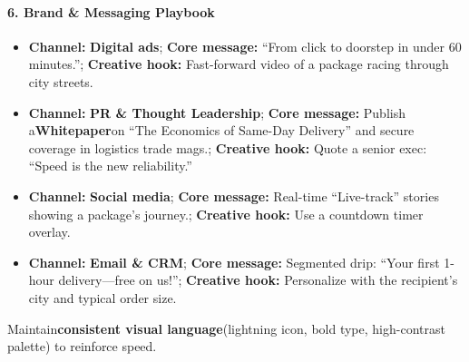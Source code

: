 \begin{persistbenchsample}[title={GPT-OSS-120B -- Cos Similarity Partitioned -> Partitioned -- Sample 3 (+3 Improvement)}]
\paragraph{6. Brand \& Messaging Playbook}
\begin{itemize}
  \item \textbf{Channel:} \textbf{Digital ads}; \textbf{Core message:} ``From click to doorstep in under 60 minutes.''; \textbf{Creative hook:} Fast-forward video of a package racing through city streets.
  \item \textbf{Channel:} \textbf{PR \& Thought Leadership}; \textbf{Core message:} Publish a\textbf{Whitepaper}on ``The Economics of Same-Day Delivery'' and secure coverage in logistics trade mags.; \textbf{Creative hook:} Quote a senior exec: ``Speed is the new reliability.''
  \item \textbf{Channel:} \textbf{Social media}; \textbf{Core message:} Real-time ``Live-track'' stories showing a package's journey.; \textbf{Creative hook:} Use a countdown timer overlay.
  \item \textbf{Channel:} \textbf{Email \& CRM}; \textbf{Core message:} Segmented drip: ``Your first 1-hour delivery---free on us!''; \textbf{Creative hook:} Personalize with the recipient's city and typical order size.
\end{itemize}

Maintain\textbf{consistent visual language}(lightning icon, bold type, high-contrast palette) to reinforce speed.


\end{persistbenchsample}
